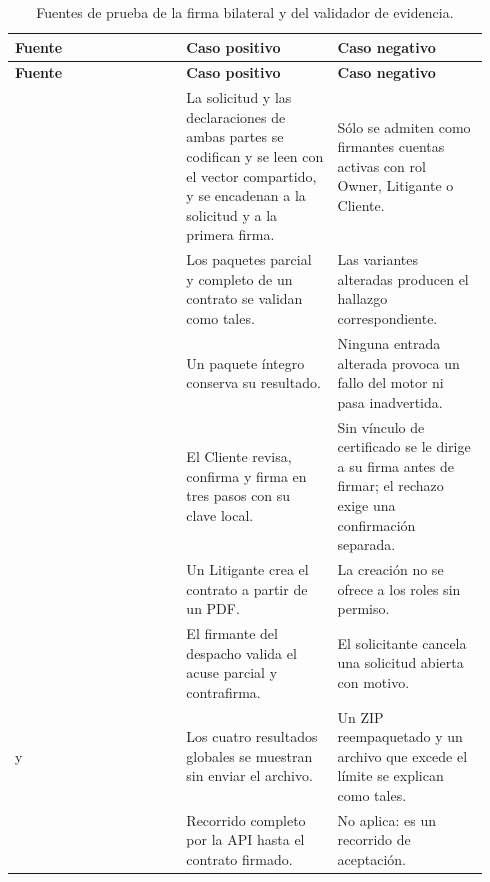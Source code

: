 \begin{longtable}{@{}L{0.34\linewidth}L{0.30\linewidth}L{0.30\linewidth}@{}}
  \caption{Fuentes de prueba de la firma bilateral y del validador de evidencia.}\label{tab:matriz-firma-bilateral}\\
  \toprule
  \textbf{Fuente} & \textbf{Caso positivo} & \textbf{Caso negativo} \\
  \midrule
  \endfirsthead
  \toprule
  \textbf{Fuente} & \textbf{Caso positivo} & \textbf{Caso negativo} \\
  \midrule
  \endhead
  \bottomrule
  \endfoot
     & La solicitud y las declaraciones de ambas partes se codifican y se leen con el vector compartido, y se encadenan a la solicitud y a la primera firma. & Sólo se admiten como firmantes cuentas activas con rol Owner, Litigante o Cliente. \\
     & Los paquetes parcial y completo de un contrato se validan como tales. & Las variantes alteradas producen el hallazgo correspondiente. \\
     & Un paquete íntegro conserva su resultado. & Ninguna entrada alterada provoca un fallo del motor ni pasa inadvertida. \\
     & El Cliente revisa, confirma y firma en tres pasos con su clave local. & Sin vínculo de certificado se le dirige a su firma antes de firmar; el rechazo exige una confirmación separada. \\
     & Un Litigante crea el contrato a partir de un PDF. & La creación no se ofrece a los roles sin permiso. \\
     & El firmante del despacho valida el acuse parcial y contrafirma. & El solicitante cancela una solicitud abierta con motivo. \\
     y  & Los cuatro resultados globales se muestran sin enviar el archivo. & Un ZIP reempaquetado y un archivo que excede el límite se explican como tales. \\
     & Recorrido completo por la API hasta el contrato firmado. & No aplica: es un recorrido de aceptación. \\
\end{longtable}

